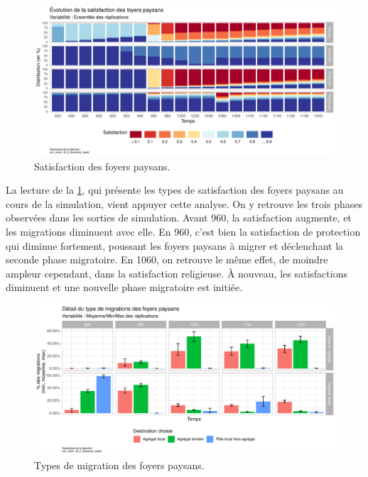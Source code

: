 \begin{figure}[H]
	\centering
	\includegraphics[width=\linewidth]{img/results_6_6/FP_Satisfaction_Haut.pdf}
	\caption{Satisfaction des foyers paysans.}
	\label{fig:results-fp-satisfaction}
\end{figure}

La lecture de la \cref{fig:results-fp-satisfaction}, qui présente les types de satisfaction des foyers paysans au cours de la simulation, vient appuyer cette analyse.
On y retrouve les trois phases observées dans les sorties de simulation.
Avant 960, la satisfaction augmente, et les migrations diminuent avec elle.
En 960, c'est bien la satisfaction de protection qui diminue fortement, poussant les foyers paysans à migrer et déclenchant la seconde phase migratoire.
En 1060, on retrouve le même effet, de moindre ampleur cependant, dans la satisfaction religieuse. À nouveau, les satisfactions diminuent et une nouvelle phase migratoire est initiée.

\begin{figure}[H]
	\centering
	\includegraphics[width=\linewidth]{img/results_6_6/FP_DeplacementsDetail_Haut.pdf}
	\caption{Types de migration des foyers paysans.}
	\label{fig:results-fp-migrations-detail}
\end{figure}

